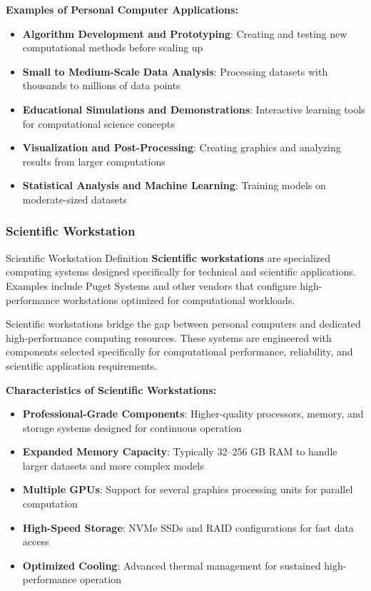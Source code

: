 \textbf{Examples of Personal Computer Applications:}
\begin{itemize}
    \item \textbf{Algorithm Development and Prototyping}: Creating and testing new computational methods before scaling up
    \item \textbf{Small to Medium-Scale Data Analysis}: Processing datasets with thousands to millions of data points
    \item \textbf{Educational Simulations and Demonstrations}: Interactive learning tools for computational science concepts
    \item \textbf{Visualization and Post-Processing}: Creating graphics and analyzing results from larger computations
    \item \textbf{Statistical Analysis and Machine Learning}: Training models on moderate-sized datasets
\end{itemize}

\subsubsection{Scientific Workstation}

\begin{conceptcard}{Scientific Workstation Definition}
\textbf{Scientific workstations} are specialized computing systems designed specifically for technical and scientific applications. Examples include Puget Systems and other vendors that configure high-performance workstations optimized for computational workloads.
\end{conceptcard}

Scientific workstations bridge the gap between personal computers and dedicated high-performance computing resources. These systems are engineered with components selected specifically for computational performance, reliability, and scientific application requirements.

\textbf{Characteristics of Scientific Workstations:}
\begin{itemize}
    \item \textbf{Professional-Grade Components}: Higher-quality processors, memory, and storage systems designed for continuous operation
    \item \textbf{Expanded Memory Capacity}: Typically 32--256 GB RAM to handle larger datasets and more complex models
    \item \textbf{Multiple GPUs}: Support for several graphics processing units for parallel computation
    \item \textbf{High-Speed Storage}: NVMe SSDs and RAID configurations for fast data access
    \item \textbf{Optimized Cooling}: Advanced thermal management for sustained high-performance operation
\end{itemize}

